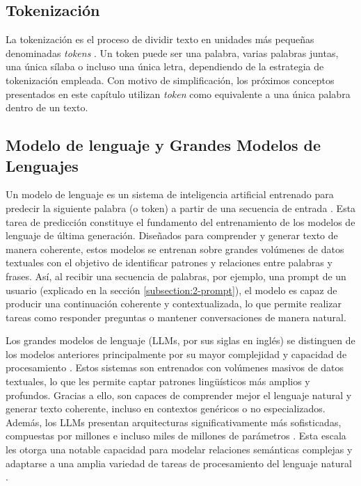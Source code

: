 \subsection{Tokenización}
\label{subsection:2-Tokenización}
La tokenización es el proceso de dividir texto en unidades más pequeñas denominadas \textit{tokens} \cite{SpeechandLanguageProcessing}. Un \gls{token} puede ser una palabra, varias palabras juntas, una única sílaba o incluso una única letra, dependiendo de la estrategia de tokenización empleada. Con motivo de simplificación, los próximos conceptos presentados en este capítulo utilizan \textit{token} como equivalente a una única palabra dentro de un texto.

\subsection{Modelo de lenguaje y Grandes Modelos de Lenguajes}
\label{subsection:2-Modelo de lenguaje y LLMS}

Un modelo de lenguaje es un sistema de inteligencia artificial entrenado para predecir la siguiente palabra (o token) a partir de una secuencia de entrada \cite{SpeechandLanguageProcessing}. Esta tarea de predicción constituye el fundamento del entrenamiento de los modelos de lenguaje de última generación. Diseñados para comprender y generar texto de manera coherente, estos modelos se entrenan sobre grandes volúmenes de datos textuales con el objetivo de identificar patrones y relaciones entre palabras y frases. Así, al recibir una secuencia de palabras, por ejemplo, una prompt de un usuario (explicado en la sección \autoref{subsection:2-prompt}), el modelo es capaz de producir una continuación coherente y contextualizada, lo que permite realizar tareas como responder preguntas o mantener conversaciones de manera natural.

Los grandes modelos de lenguaje (LLMs, por sus siglas en inglés) se distinguen de los modelos anteriores principalmente por su mayor complejidad y capacidad de procesamiento \cite{Zhao2023LLMSurvey}. Estos sistemas son entrenados con volúmenes masivos de datos textuales, lo que les permite captar patrones lingüísticos más amplios y profundos. Gracias a ello, son capaces de comprender mejor el lenguaje natural y generar texto coherente, incluso en contextos genéricos o no especializados. Además, los LLMs presentan arquitecturas significativamente más sofisticadas, compuestas por millones e incluso miles de millones de parámetros \cite{SpeechandLanguageProcessing}. Esta escala les otorga una notable capacidad para modelar relaciones semánticas complejas y adaptarse a una amplia variedad de tareas de procesamiento del lenguaje natural \cite{Zhao2023LLMSurvey}.


